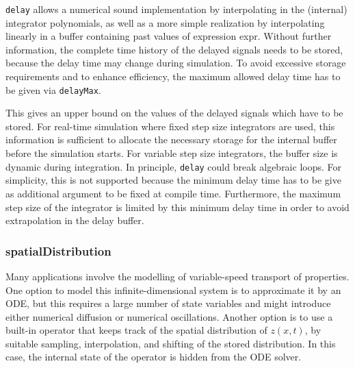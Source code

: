 \begin{nonnormative}
\lstinline!delay! allows a numerical sound
implementation by interpolating in the (internal) integrator
polynomials, as well as a more simple realization by interpolating
linearly in a buffer containing past values of expression expr. Without
further information, the complete time history of the delayed signals
needs to be stored, because the delay time may change during simulation.
To avoid excessive storage requirements and to enhance efficiency, the
maximum allowed delay time has to be given via \lstinline!delayMax!.

This gives an upper bound on the values of the delayed signals
which have to be stored. For real-time simulation where fixed step size
integrators are used, this information is sufficient to allocate the
necessary storage for the internal buffer before the simulation starts.
For variable step size integrators, the buffer size is dynamic during
integration. In principle, \lstinline!delay! could break algebraic
loops. For simplicity, this is not supported because the minimum delay
time has to be give as additional argument to be fixed at compile time.
Furthermore, the maximum step size of the integrator is limited by this
minimum delay time in order to avoid extrapolation in the delay
buffer.
\end{nonnormative}

\subsubsection{spatialDistribution}\label{spatialdistribution}

\begin{nonnormative}
Many applications involve the modelling of variable-speed
transport of properties. One option to model this infinite-dimensional
system is to approximate it by an ODE, but this requires a large number
of state variables and might introduce either numerical diffusion or
numerical oscillations. Another option is to use a built-in operator
that keeps track of the spatial distribution of $z(x, t)$, by suitable
sampling, interpolation, and shifting of the stored distribution. In
this case, the internal state of the operator is hidden from the ODE
solver.
\end{nonnormative}

